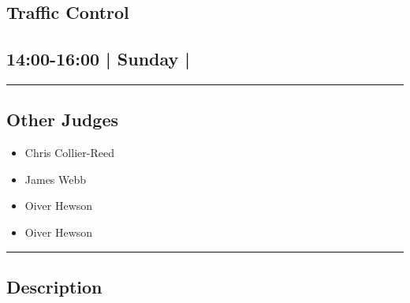\documentclass[10pt, A5]{article}
\begin{document}
		\begin{framed}
			\begin{minipage}{\textwidth}

			\setcounter{section}{116}
							\section{Traffic Control}
						
			\subsection*{14:00-16:00 | Sunday | }

			\vspace{0.25cm}
			\hrule
			\vspace{0.25cm}


			\subsection*{Other Judges}
							

				\begin{multicols}{2}

			\begin{itemize}
											\item Chris Collier-Reed
											\item James Webb
											\item Oiver Hewson
								\end{itemize}

			\vfill\null
			\columnbreak

			\begin{itemize}
											\item Oiver Hewson
								\end{itemize}

			\vfill\null

			\end{multicols}

			\vspace{0.25cm}
			\hrule
			\vspace{0.25cm}

			\begin{minipage}{\textwidth}
			\subsection*{\faListAlt \: Description}
			
			\end{minipage}


	\end{minipage}
	\end{framed}
\end{document}
